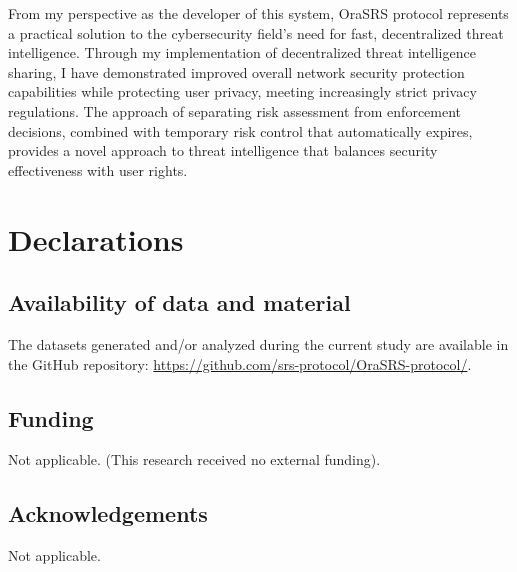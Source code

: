 \documentclass[12pt]{article}
\begin{document}
From my perspective as the developer of this system, OraSRS protocol represents a practical solution to the cybersecurity field's need for fast, decentralized threat intelligence. Through my implementation of decentralized threat intelligence sharing, I have demonstrated improved overall network security protection capabilities while protecting user privacy, meeting increasingly strict privacy regulations. The approach of separating risk assessment from enforcement decisions, combined with temporary risk control that automatically expires, provides a novel approach to threat intelligence that balances security effectiveness with user rights.

\section*{Declarations}

\subsection*{Availability of data and material}
The datasets generated and/or analyzed during the current study are available in the GitHub repository: \url{https://github.com/srs-protocol/OraSRS-protocol/}.

\subsection*{Funding}
Not applicable. (This research received no external funding).

\subsection*{Acknowledgements}
Not applicable.
\end{document}
